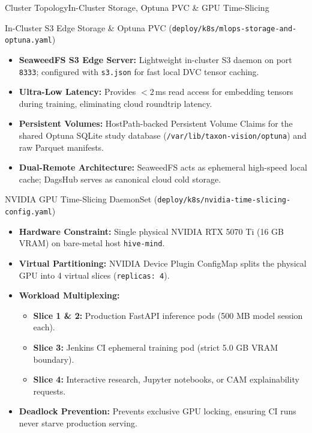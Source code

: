 \begin{frame}{Cluster Topology}{In-Cluster Storage, Optuna PVC \& GPU Time-Slicing}
    \begin{block}{In-Cluster S3 Edge Storage \& Optuna PVC (\texttt{deploy/k8s/mlops-storage-and-optuna.yaml})}
        \begin{itemize}\tiny
            \item \textbf{SeaweedFS S3 Edge Server:} Lightweight in-cluster S3 daemon on port \texttt{8333}; configured with \texttt{s3.json} for fast local DVC tensor caching.
            \item \textbf{Ultra-Low Latency:} Provides $<2$\,ms read access for embedding tensors during training, eliminating cloud roundtrip latency.
            \item \textbf{Persistent Volumes:} HostPath-backed Persistent Volume Claims for the shared Optuna SQLite study database (\texttt{/var/lib/taxon-vision/optuna}) and raw Parquet manifests.
            \item \textbf{Dual-Remote Architecture:} SeaweedFS acts as ephemeral high-speed local cache; DagsHub serves as canonical cloud cold storage.
        \end{itemize}
    \end{block}

    \vspace{-0.15cm}

    \begin{block}{NVIDIA GPU Time-Slicing DaemonSet (\texttt{deploy/k8s/nvidia-time-slicing-config.yaml})}
        \begin{itemize}\tiny
            \item \textbf{Hardware Constraint:} Single physical NVIDIA RTX 5070 Ti (16 GB VRAM) on bare-metal host \texttt{hive-mind}.
            \item \textbf{Virtual Partitioning:} NVIDIA Device Plugin ConfigMap splits the physical GPU into 4 virtual slices (\texttt{replicas: 4}).
            \item \textbf{Workload Multiplexing:}
            \begin{itemize}\tiny
                \item \textbf{Slice 1 \& 2:} Production FastAPI inference pods (500 MB model session each).
                \item \textbf{Slice 3:} Jenkins CI ephemeral training pod (strict 5.0 GB VRAM boundary).
                \item \textbf{Slice 4:} Interactive research, Jupyter notebooks, or CAM explainability requests.
            \end{itemize}
            \item \textbf{Deadlock Prevention:} Prevents exclusive GPU locking, ensuring CI runs never starve production serving.
        \end{itemize}
    \end{block}


\end{frame}
